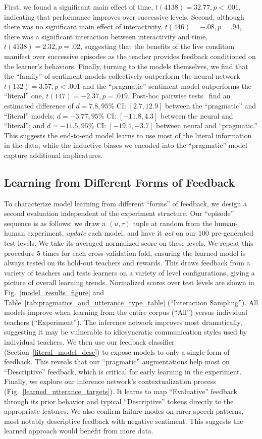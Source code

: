 \documentclass[letterpaper]{article} %
\begin{document}
First, we found a significant main effect of time, $t(4138)=32.77, p<.001$, indicating that performance improves over successive levels. 
Second, although there was no significant main effect of interactivity, $t(446)=-.08, p=.94$, there was a significant interaction between  interactivity and time, $t(4138)=2.32, p=.02$, suggesting that the benefits of the live condition manifest over successive episodes as the teacher provides feedback conditioned on the learner's behaviors. 
Finally, turning to the models themselves, we find that the ``family'' of sentiment models collectively outperform the neural network $t(132)=3.57, p<.001$ and the ``pragmatic'' sentiment model outperforms the ``literal'' one, $t(147)=-2.37, p=.019$.
Post-hoc pairwise tests~\cite{tukey1953section} find an estimated difference of $d = 7.8, 95\%$ CI: $[2.7, 12.9]$ between the ``pragmatic'' and ``literal'' models; $d = -3.77, 95\%$ CI: $[-11.8, 4.3]$ between the neural and ``literal''; and $d = -11.5, 95\%$ CI: $[-19.4, -3.7]$ between neural and ``pragmatic.'' 
This suggests the end-to-end model learns to use most of the literal information in the data, while the inductive biases we encoded into the ``pragmatic'' model capture additional implicatures. 
\subsection{Learning from Different Forms of Feedback}
\label{random_sample_interactions}
\label{feedback_types}
To characterize model learning from different ``forms'' of feedback, we design a second evaluation independent of the experiment structure. Our ``episode'' sequence is as follows: we draw a $(u, \tau)$ tuple at random from the human-human experiment, \emph{update} each model, and have it \emph{act} on our 100 pre-generated test levels. We take its averaged normalized score on these levels. We repeat this procedure 5 times for each cross-validation fold, ensuring the learned model is always tested on its hold-out teachers and rewards. This draws feedback from a variety of teachers and tests learners on a variety of level configurations, giving a picture of overall learning trends. Normalized scores over test levels are shown in Fig.~\ref{model_results_figure} and Table~\ref{tab:pragmatics_and_utterance_type_table} (``Interaction Sampling''). All models improve when learning from the entire corpus (``All'') versus individual teachers (``Experiment''). The inference network improves most dramatically, suggesting it may be vulnerable to idiosyncratic communication styles used by individual teachers. We then use our feedback classifier (Section~\ref{literal_model_desc}) to expose models to only a single form of feedback. This reveals that our ``pragmatic'' augmentations help most on ``Descriptive'' feedback, which is critical for early learning in the experiment. Finally, we explore our inference network's contextualization process (Fig.~\ref{learned_utterance_targets}). It learns to map ``Evaluative'' feedback through its prior behavior and typical ``Descriptive'' tokens directly to the appropriate features. We also confirm failure modes on rarer speech patterns, most notably descriptive feedback with negative sentiment. This suggests the learned approach would benefit from more data.
\end{document}
